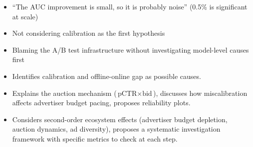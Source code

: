 \begin{interviewq}
\redflags
\begin{itemize}
    \item ``The AUC improvement is small, so it is probably noise'' (0.5\% is significant at scale)
    \item Not considering calibration as the first hypothesis
    \item Blaming the A/B test infrastructure without investigating model-level causes first
\end{itemize}


\goodgreat
\begin{itemize}
    \item {} Identifies calibration and offline-online gap as possible causes.
    \item {} Explains the auction mechanism ($\text{pCTR} \times \text{bid}$), discusses how miscalibration affects advertiser budget pacing, proposes reliability plots.
    \item {} Considers second-order ecosystem effects (advertiser budget depletion, auction dynamics, ad diversity), proposes a systematic investigation framework with specific metrics to check at each step.
\end{itemize}

\end{interviewq}

